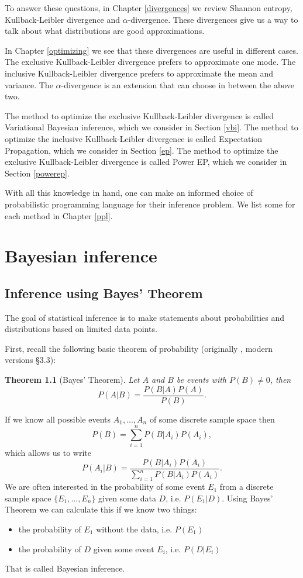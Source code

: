 \documentclass[12pt,vu]{adammath}
\newcommand\ddfrac[2]{\frac{\displaystyle #1}{\displaystyle #2}}
\theoremstyle{plain}
\newtheorem{theorem}{Theorem}[chapter]
\theoremstyle{definition}
\theoremstyle{remark}
\begin{document}
To answer these questions, in Chapter \ref{divergences} we review Shannon entropy, Kullback-Leibler divergence and $\alpha$-divergence.
These divergences give us a way to talk about what distributions are good approximations.

In Chapter \ref{optimizing} we see that these divergences are useful in different cases.
The exclusive Kullback-Leibler divergence prefers to approximate one mode.
The inclusive Kullback-Leibler divergence prefers to approximate the mean and variance.
The $\alpha$-divergence is an extension that can choose in between the above two.

The method to optimize the exclusive Kullback-Leibler divergence is called Variational Bayesian inference, which we consider in Section \ref{vbi}.
The method to optimize the inclusive Kullback-Leibler divergence is called Expectation Propagation, which we consider in Section \ref{ep}.
The method to optimize the exclusive Kullback-Leibler divergence is called Power EP, which we consider in Section \ref{powerep}.

With all this knowledge in hand, one can make an informed choice of probabilistic programming language for their inference problem.
We list some for each method in Chapter \ref{ppl}.

\chapter{Bayesian inference}\label{bayesinf}
\section{Inference using Bayes' Theorem}
The goal of statistical inference is to make statements about probabilities and distributions based on limited data points.

First, recall the following basic theorem of probability (originally \cite{bayes}, modern versions \cite{firstcourse} \S 3.3):
\begin{theorem}[Bayes' Theorem]
Let $A$ and $B$ be events with $P(B) \ne 0$, then
$$P(A|B) = \ddfrac{P(B|A) P(A)}{P(B)}.$$
\end{theorem}
If we know all possible events $A_1, ..., A_n$ of some discrete sample space then
$$P(B) = \sum_{i=1}^n P(B | A_i) P(A_i),$$
which allows us to write
$$P(A_i|B) = \ddfrac{P(B|A_i) P(A_i)}{\sum_{i=1}^n P(B | A_i) P(A_i)}.$$
We are often interested in the probability of some event $E_1$ from a discrete sample space $\{ E_1, ..., E_n \}$ given some data $D$, i.e. $P(E_1 | D)$.
Using Bayes' Theorem we can calculate this if we know two things:
\begin{itemize}
\item the probability of $E_1$ without the data, i.e. $P(E_1)$
\item the probability of $D$ given some event $E_i$, i.e. $P(D | E_i)$
\end{itemize}
That is called Bayesian inference.
\end{document}
